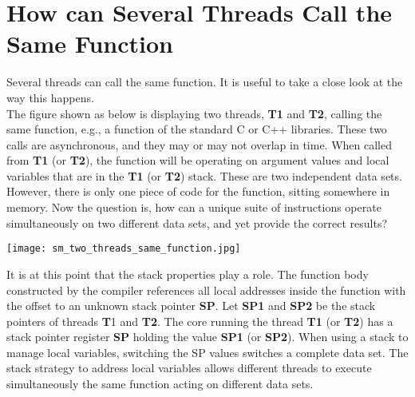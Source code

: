 \documentclass[12pt,a4paper]{article}
\begin{document}
\section{How can Several Threads Call the Same Function}
Several threads can call the same function. It is useful to take a close look at the way this happens.
\\
The figure shown as below is displaying two threads, \textbf{T1} and \textbf{T2}, calling the same function, e.g., a function of the standard C or C++ libraries. These two calls are asynchronous, and they may or may not overlap in time. When called from \textbf{T1} (or \textbf{T2}), the function will be operating on argument values and local variables that are in the \textbf{T1} (or \textbf{T2}) stack. These are two independent data sets. However, there is only one piece of code for the function, sitting somewhere in memory. Now the question is, how can a unique suite of instructions operate simultaneously on two different data sets, and yet provide the correct results?
\begin{center}
	\texttt{[image: sm\_two\_threads\_same\_function.jpg]}
\end{center}
It is at this point that the stack properties play a role. The function body constructed by the compiler references all local addresses inside the function with the offset to an unknown stack pointer \textbf{SP}. Let \textbf{SP1} and \textbf{SP2} be the stack pointers of threads \textbf{T}1 and \textbf{T2}. The core running the thread \textbf{T1} (or \textbf{T2}) has a stack pointer register \textbf{SP} holding the value \textbf{SP1} (or \textbf{SP2}). When using a stack to manage local variables, switching the SP values switches a complete data set. The stack strategy to address local variables allows different threads to execute simultaneously the same function acting on different data sets.
\end{document}
